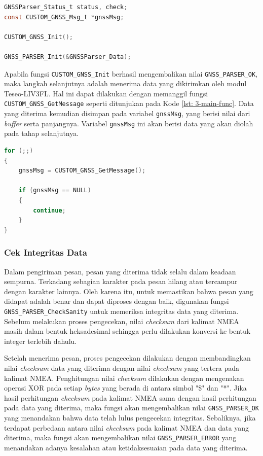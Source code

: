 \vspace{0.3cm}
\begin{lstlisting}[language=c, style=mystyle, caption={Inisiasi Struktur \texttt{GNSSParser\_Data\_t} pada \textit{Firmware}}, label={lst: 3-main-func2}]
GNSSParser_Status_t status, check;
const CUSTOM_GNSS_Msg_t *gnssMsg;

CUSTOM_GNSS_Init();

GNSS_PARSER_Init(&GNSSParser_Data);
\end{lstlisting}

Apabila fungsi \texttt{CUSTOM\_GNSS\_Init} berhasil mengembalikan nilai \texttt{GNSS\_PARSER\_OK}, maka langkah selanjutnya adalah menerima data yang dikirimkan oleh modul Teseo-LIV3FL. Hal ini dapat dilakukan dengan memanggil fungsi \texttt{CUSTOM\_GNSS\_GetMessage} seperti ditunjukan pada Kode \ref{lst: 3-main-func}. Data yang diterima kemudian disimpan pada variabel \texttt{gnssMsg}, yang berisi nilai dari \textit{buffer} serta panjangnya. Variabel \texttt{gnssMsg} ini akan berisi data yang akan diolah pada tahap selanjutnya.

\vspace{0.3cm}
\begin{lstlisting}[language=c, style=mystyle, caption={Memuat Pustaka pada \textit{Firmware}}, label={lst: 3-main-func}]
for (;;)
{
	gnssMsg = CUSTOM_GNSS_GetMessage();

	if (gnssMsg == NULL)
	{
		continue;
	}
}
\end{lstlisting}

\subsubsection{Cek Integritas Data}
Dalam pengiriman pesan, pesan yang diterima tidak selalu dalam keadaan sempurna. Terkadang sebagian karakter pada pesan hilang atau tercampur dengan karakter lainnya. Oleh karena itu, untuk memastikan bahwa pesan yang didapat adalah benar dan dapat diproses dengan baik, digunakan fungsi \texttt{GNSS\_PARSER\_CheckSanity} untuk memeriksa integritas data yang diterima. Sebelum melakukan proses pengecekan, nilai \textit{checksum} dari kalimat NMEA masih dalam bentuk heksadesimal sehingga perlu dilakukan konversi ke bentuk integer terlebih dahulu.

Setelah menerima pesan, proses pengecekan dilakukan dengan membandingkan nilai \textit{checksum} data yang diterima dengan nilai \textit{checksum} yang tertera pada kalimat NMEA. Penghitungan nilai \textit{checksum} dilakukan dengan mengenakan operasi XOR pada setiap \textit{bytes} yang berada di antara simbol "\$" dan "*". Jika hasil perhitungan \textit{checksum} pada kalimat NMEA sama dengan hasil perhitungan pada data yang diterima, maka fungsi akan mengembalikan nilai \texttt{GNSS\_PARSER\_OK} yang menandakan bahwa data telah lulus pengecekan integritas. Sebaliknya, jika terdapat perbedaan antara nilai \textit{checksum} pada kalimat NMEA dan data yang diterima, maka fungsi akan mengembalikan nilai \texttt{GNSS\_PARSER\_ERROR} yang menandakan adanya kesalahan atau ketidaksesuaian pada data yang diterima.

